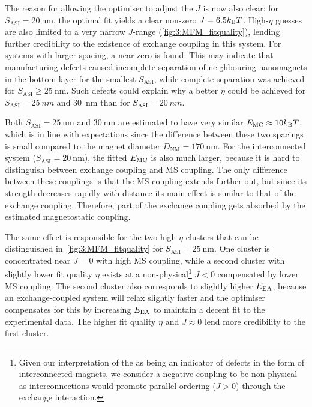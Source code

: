 The reason for allowing the optimiser to adjust the  $J$ is now also clear: for $S_\mathrm{ASI} = \SI{20}{\nano\metre}$, the optimal fit yields a clear non-zero $J = 6.5 \kBT$.
High-$\eta$ guesses are also limited to a very narrow $J$-range (\cref{fig:3:MFM_fitquality}), lending further credibility to the existence of exchange coupling in this system.
For systems with larger spacing, a near-zero  is found.
This may indicate that manufacturing defects caused incomplete separation of neighbouring nanomagnets in the bottom  layer for the smallest $S_\mathrm{ASI}$, while complete separation was achieved for $S_\mathrm{ASI} \geq \SI{25}{\nano\metre}$.
Such defects could explain why a better  $\eta$ could be achieved for $S_\mathrm{ASI} = \SI{25}{nm}$ and \SI{30}{\nano\metre} than for $S_\mathrm{ASI} = \SI{20}{nm}$. \par
Both $S_\mathrm{ASI} = \SI{25}{\nano\metre}$ and $\SI{30}{\nano\metre}$ are estimated to have very similar $\EMC \approx 10 \kBT$, which is in line with expectations since the difference between these two spacings is small compared to the magnet diameter $D_\mathrm{NM} = \SI{170}{\nano\metre}$.
For the interconnected system ($S_\mathrm{ASI} = \SI{20}{\nano\metre}$), the fitted  $E_\mathrm{MC}$ is also much larger, because it is hard to distinguish between exchange coupling and MS coupling.
The only difference between these couplings is that the MS coupling extends further out, but since its strength decreases rapidly with distance its main effect is similar to that of the exchange coupling.
Therefore, part of the exchange coupling gets absorbed by the estimated magnetostatic coupling. \par
The same effect is responsible for the two high-$\eta$ clusters that can be distinguished in~\cref{fig:3:MFM_fitquality} for $S_\mathrm{ASI} = \SI{25}{\nano\metre}$.
One cluster is concentrated near $J=0$ with high MS coupling, while a second cluster with slightly lower fit quality $\eta$ exists at a non-physical\footnote{
	Given our interpretation of the  as being an indicator of defects in the form of interconnected magnets, we consider a negative coupling to be non-physical as interconnections would promote parallel ordering ($J > 0$) through the  exchange interaction.
} $J < 0$ compensated by lower MS coupling.
The second cluster also corresponds to slightly higher $E_\mathrm{EA}$, because an exchange-coupled system will relax slightly faster and the optimiser compensates for this by increasing $E_\mathrm{EA}$ to maintain a decent fit to the experimental data.
The higher fit quality $\eta$ and $J \approx 0$ lend more credibility to the first cluster. \\\par

